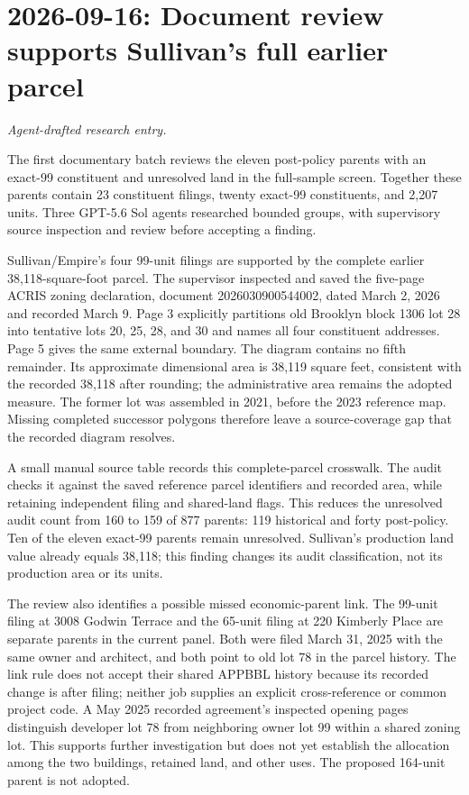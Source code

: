 \clearpage
\section*{2026-09-16: Document review supports Sullivan's full earlier parcel}
\textit{Agent-drafted research entry.}

The first documentary batch reviews the eleven post-policy parents with an
exact-99 constituent and unresolved land in the full-sample screen. Together
these parents contain 23 constituent filings, twenty exact-99 constituents,
and 2,207 units. Three GPT-5.6 Sol agents researched bounded groups, with
supervisory source inspection and review before accepting a finding.

Sullivan/Empire's four 99-unit filings are supported by the complete earlier
38,118-square-foot parcel. The supervisor inspected and saved the five-page
ACRIS zoning declaration, document 2026030900544002, dated March 2, 2026 and
recorded March 9. Page 3 explicitly partitions old Brooklyn block 1306 lot
28 into tentative lots 20, 25, 28, and 30 and names all four constituent
addresses. Page 5 gives the same external boundary. The diagram contains no
fifth remainder. Its approximate dimensional area is 38,119 square feet,
consistent with the recorded 38,118 after rounding; the administrative area
remains the adopted measure. The former lot was assembled in 2021, before
the 2023 reference map. Missing completed successor polygons therefore leave
a source-coverage gap that the recorded diagram resolves.

A small manual source table records this complete-parcel crosswalk. The audit
checks it against the saved reference parcel identifiers and recorded area,
while retaining independent filing and shared-land flags. This reduces the
unresolved audit count from 160 to 159 of 877 parents: 119 historical and
forty post-policy. Ten of the eleven exact-99 parents remain unresolved.
Sullivan's production land value already equals 38,118; this finding changes
its audit classification, not its production area or its units.

The review also identifies a possible missed economic-parent link. The
99-unit filing at 3008 Godwin Terrace and the 65-unit filing at 220 Kimberly
Place are separate parents in the current panel. Both were filed March 31,
2025 with the same owner and architect, and both point to old lot 78 in the
parcel history. The link rule does not accept their shared APPBBL history
because its recorded change is after filing; neither job supplies an explicit
cross-reference or common project code. A May 2025 recorded agreement's
inspected opening pages distinguish developer lot 78 from neighboring owner
lot 99 within a shared zoning lot. This supports further investigation but
does not yet establish the allocation among the two buildings, retained land,
and other uses. The proposed 164-unit parent is not adopted.

